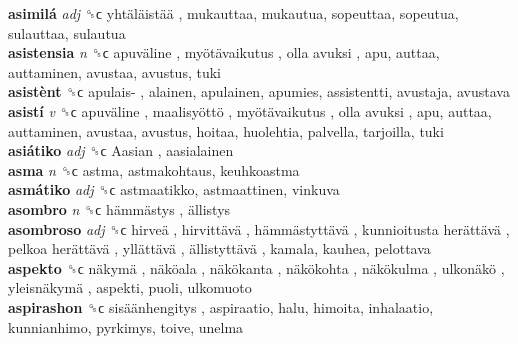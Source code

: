 \textbf{asimilá} \emph{adj}  ␝ϲ   yhtäläistää , mukauttaa, mukautua, sopeuttaa, sopeutua, sulauttaa, sulautua  \\
\textbf{asistensia} \emph{n}  ␝ϲ   apuväline ,  myötävaikutus ,  olla avuksi , apu, auttaa, auttaminen, avustaa, avustus, tuki  \\
\textbf{asistènt} ␝ϲ   apulais- , alainen, apulainen, apumies, assistentti, avustaja, avustava  \\
\textbf{asistí} \emph{v}  ␝ϲ   apuväline ,  maalisyöttö ,  myötävaikutus ,  olla avuksi , apu, auttaa, auttaminen, avustaa, avustus, hoitaa, huolehtia, palvella, tarjoilla, tuki  \\
\textbf{asiátiko} \emph{adj}  ␝ϲ   Aasian , aasialainen  \\
\textbf{asma} \emph{n}  ␝ϲ  astma, astmakohtaus, keuhkoastma  \\
\textbf{asmátiko} \emph{adj}  ␝ϲ  astmaatikko, astmaattinen, vinkuva  \\
\textbf{asombro} \emph{n}  ␝ϲ   hämmästys ,  ällistys   \\
\textbf{asombroso} \emph{adj}  ␝ϲ   hirveä ,  hirvittävä ,  hämmästyttävä ,  kunnioitusta herättävä ,  pelkoa herättävä ,  yllättävä ,  ällistyttävä , kamala, kauhea, pelottava  \\
\textbf{aspekto} ␝ϲ   näkymä ,  näköala ,  näkökanta ,  näkökohta ,  näkökulma ,  ulkonäkö ,  yleisnäkymä , aspekti, puoli, ulkomuoto  \\
\textbf{aspirashon} ␝ϲ   sisäänhengitys , aspiraatio, halu, himoita, inhalaatio, kunnianhimo, pyrkimys, toive, unelma  \\
